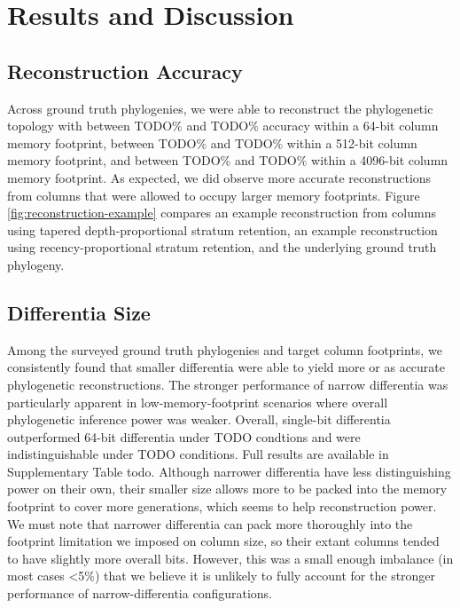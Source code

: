 \section{Results and Discussion} \label{sec:results}

\subsection{Reconstruction Accuracy}



Across ground truth phylogenies, we were able to reconstruct the phylogenetic topology with between TODO\% and TODO\% accuracy within a 64-bit column memory footprint, between TODO\% and TODO\% within a 512-bit column memory footprint, and between TODO\% and TODO\% within a 4096-bit column memory footprint.
As expected, we did observe more accurate reconstructions from columns that were allowed to occupy larger memory footprints.
Figure \ref{fig:reconstruction-example} compares an example reconstruction from columns using tapered depth-proportional stratum retention, an example reconstruction using recency-proportional stratum retention,  and the underlying ground truth phylogeny.

\subsection{Differentia Size}

Among the surveyed ground truth phylogenies and target column footprints, we consistently found that smaller differentia were able to yield more or as accurate phylogenetic reconstructions.
The stronger performance of narrow differentia was particularly apparent in low-memory-footprint scenarios where overall phylogenetic inference power was weaker.
Overall, single-bit differentia outperformed 64-bit differentia under TODO condtions and were indistinguishable under TODO conditions.
Full results are available in Supplementary Table todo.
Although narrower differentia have less distinguishing power on their own, their smaller size allows more to be packed into the memory footprint to cover more generations, which seems to help reconstruction power.
We must note that narrower differentia can pack more thoroughly into the footprint limitation we imposed on column size, so their extant columns tended to have slightly more overall bits.
However, this was a small enough imbalance (in most cases <5\%) that we believe it is unlikely to fully account for the stronger performance of narrow-differentia configurations.

